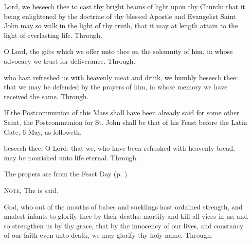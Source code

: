 \collect

\vspace{-0.1\baselineskip}

 Lord, we beseech thee to cast thy bright beams of light upon thy Church: that it being enlightened by the doctrine of thy blessed Apostle and Evangelist Saint John may so walk in the light of thy truth, that it may at length attain to the light of everlasting life. Through.

\secret
{} O Lord, the gifts which we offer unto thee on the solemnity of him, in whose advocacy we trust for deliverance. Through.


\vspace{-0.25\baselineskip}

\postcommunion

\vspace{-0.1\baselineskip}

 who hast refreshed us with heavenly meat and drink, we humbly beseech thee: that we may be defended by the prayers of him, in whose memory we have received the same. Through.

\begin{rubric}
	If the Postcommunion of this Mass shall have been already said for some other Saint, the Postcommunion for St. John shall be that of his Feast before the Latin Gate, 6 May, as followeth.
\end{rubric}
 beseech thee, O Lord: that we, who have been refreshed with heavenly bread, may be nourished unto life eternal. Through.



\clearpage
{}

\begin{rubric}
	The propers are from the Feast Day (p. \pageref{HolyInnocents}).
\end{rubric}

\begin{rubric}
	\textsc{Note,} The  is said.
\end{rubric}

\collect
{} God, who out of the mouths of babes and sucklings hast ordained strength, and madest infants to glorify thee by their deaths: mortify and kill all vices in us; and so strengthen us by thy grace, that by the innocency of our lives, and constancy of our faith even unto death, we may glorify thy holy name. Through.

